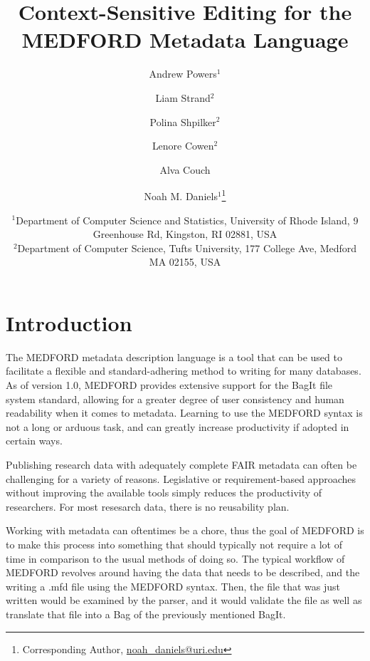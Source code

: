 \documentclass[]{article}%
\title{Context-Sensitive Editing for the MEDFORD Metadata Language}
\author{Andrew Powers$^1$ \and Liam Strand$^2$ \and Polina Shpilker$^2$ \and Lenore Cowen$^2$ \and Alva Couch \and Noah M. Daniels$^1$\thanks{Corresponding Author, \href{email:noah_daniels@uri.edu}{noah\_daniels@uri.edu}}}
\date{
	$^1$Department of Computer Science and Statistics, University of Rhode Island, 9 Greenhouse Rd, Kingston, RI 02881, USA\\%
	$^2$Department of Computer Science, Tufts University, 177 College Ave, Medford MA 02155, USA%
}
\begin{document}
	\maketitle

	\tableofcontents







\section{Introduction}
The MEDFORD metadata description language is a tool that can be used to facilitate a flexible and standard-adhering method to writing for many databases. As of version 1.0, MEDFORD provides extensive support for the BagIt file system standard, allowing for a greater degree of user consistency and human readability when it comes to metadata. Learning to use the MEDFORD syntax is not a long or arduous task, and can greatly increase productivity if adopted in certain ways.

Publishing research data with adequately complete FAIR metadata can often be challenging for a variety of reasons.
Legislative or requirement-based approaches without improving the available tools simply reduces the productivity of researchers.
For most resesarch data, there is no reusability plan.

Working with metadata can oftentimes be a chore, thus the goal of MEDFORD is to make this process into something that should typically not require a lot of time in comparison to the usual methods of doing so. The typical workflow of MEDFORD revolves around having the data that needs to be described, and the writing a .mfd file using the MEDFORD syntax. Then, the file that was just written would be examined by the parser, and it would validate the file as well as translate that file into a Bag of the previously mentioned BagIt.
\end{document}
